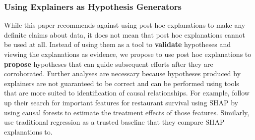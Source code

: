 \documentclass[mnsc,blindrev]{informs3}
\newcommand{\tw}[1]{\textcolor{red}{Tong: #1}}
\begin{document}
    \subsubsection{Using Explainers as Hypothesis Generators}
      While this paper recommends against using post hoc explanations to make any definite claims about data, it does not mean that post hoc explanations cannot be used at all. Instead of using them as a tool to \textbf{validate} hypotheses and viewing the explanations as evidence, we propose to use post hoc explanations to \textbf{propose} hypotheses that can guide subsequent efforts after they are corroborated.  %
     Further analyses are necessary because hypotheses produced by explainers are not guaranteed to be correct and can be performed using tools that are more suited to identification of causal relationships. For example,  \cite{zhang2023can} follow up their search for important features for restaurant survival using SHAP by using causal forests to estimate the treatment effects of those features. Similarly, \cite{hanauer22boosting} use traditional regression as a trusted baseline that they compare SHAP explanations to. 
    
\end{document}
